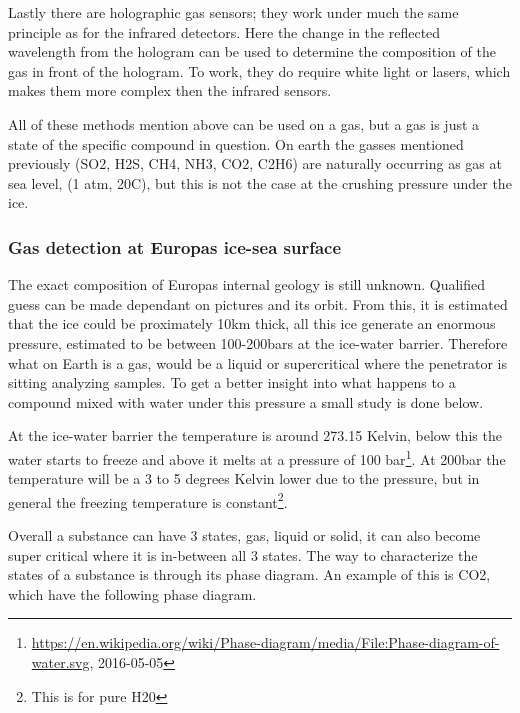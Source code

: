 Lastly there are holographic gas sensors; they work under much the same principle as for the infrared detectors. Here the change in the reflected wavelength from the hologram can be used to determine the composition of the gas in front of the hologram. To work, they do require white light or lasers, which makes them more complex then the infrared sensors.

All of these methods mention above can be used on a gas, but a gas is just a state of the specific compound in question. On earth the gasses mentioned previously (SO2, H2S, CH4, NH3, CO2, C2H6) are naturally occurring as gas at sea level, (1 atm, 20C), but this is not the case at the crushing pressure under the ice.

\subsubsection{Gas detection at Europas ice-sea surface}

The exact composition of Europas internal geology is still unknown. Qualified guess can be made dependant on pictures and its orbit. From this, it is estimated that the ice could be proximately 10km thick, all this ice generate an enormous pressure, estimated to be between 100-200bars at the ice-water barrier. Therefore what on Earth is a gas, would be a liquid or supercritical where the penetrator is sitting analyzing samples. To get a better insight into what happens to a compound mixed with water under this pressure a small study is done below.

At the ice-water barrier the temperature is around 273.15 Kelvin, below this the water starts to freeze and above it melts at a pressure of 100 bar\footnote{\url{https://en.wikipedia.org/wiki/Phase-diagram/media/File:Phase-diagram-of-water.svg}, 2016-05-05}. At 200bar the temperature will be a 3 to 5 degrees Kelvin lower due to the pressure, but in general the freezing temperature is constant\footnote{This is for pure H20}.

Overall a substance can have 3 states, gas, liquid or solid, it can also become super critical where it is in-between all 3 states. The way to characterize the states of a substance is through its phase diagram. An example of this is CO2, which have the following phase diagram.

